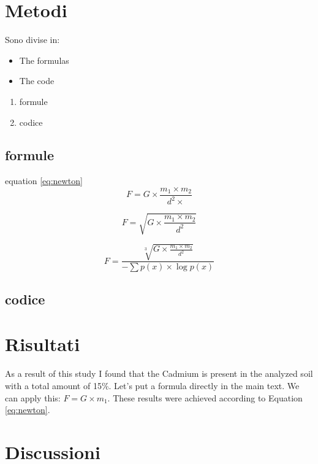 \documentclass[a4paper,12pt]{article} %
\begin{document}
\section{Metodi}

Sono divise in:
\begin{itemize}
    \item The formulas
    \item The code
\end{itemize}

\begin{enumerate}
    \item formule
    \item codice
\end{enumerate}

\subsection{formule}
equation \ref{eq:newton}
\begin{equation}
   F = G \times \frac{m_{1} \times m_{2}}{d^{2} \times}
   \label{eq:newton}
\end{equation}

\begin{equation}
    F = \sqrt{G \times \frac{m_{1} \times m_{2}}{d^{2}}}
\end{equation}

\begin{equation}
     F = \frac{\sqrt[3]{G \times \frac{m_{1} \times m_{2}}{d^{2}}}}{-\sum{p(x) \times \log{p(x)}}}
\end{equation}
\subsection{codice}



\section{Risultati}

As a result of this study I found that the Cadmium is present in the analyzed soil with a total amount of 15\%.
Let's put a formula directly in the main text. We can apply this: $F=G \times m_{1}$. These results were achieved according to Equation \ref{eq:newton}.

\section{Discussioni}
\end{document}
